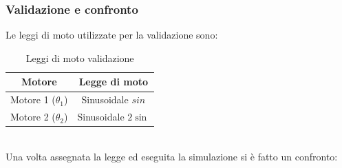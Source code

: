 \subsubsection*{Validazione e confronto}
Le leggi di moto utilizzate per la validazione sono: 
\begin{table}[h!]
	\centering
	\begin{tabular}{|c|c|} 
		\hline
		Motore & Legge di moto  \\
		\hline\hline
		Motore 1 ($\theta_1$)& Sinusoidale $sin$ \\
		Motore 2 ($\theta_2$)& Sinusoidale $2\sin$ \\
		\hline
	\end{tabular}
	\caption{Leggi di moto validazione}
	\label{table:ldmAdams}
\end{table}
\\Una volta assegnata la legge ed eseguita la simulazione si è fatto un confronto:
